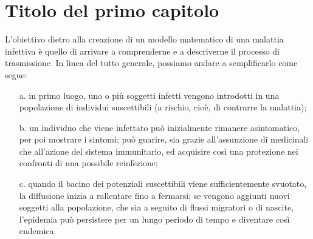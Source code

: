 \chapter{Titolo del primo capitolo}
\label{chap:cap1}
L'obiettivo dietro alla creazione di un modello matematico di una malattia infettiva è quello di arrivare a comprenderne e a descriverne il processo di trasmissione. In linea del tutto generale, possiamo andare a semplificarlo come segue:

\begin{enumerate}
\item[a.] in primo luogo, uno o più soggetti infetti vengono introdotti in una popolazione di individui suscettibili (a rischio, cioè, di contrarre la malattia);
\item[b.] un individuo che viene infettato può inizialmente rimanere asintomatico, per poi mostrare i sintomi; può guarire, sia grazie all'assunzione di medicinali che all'azione del sistema immunitario, ed acquisire così una protezione nei confronti di una possibile reinfezione;
\item[c.] quando il bacino dei potenziali suscettibili viene sufficientemente svuotato, la diffusione inizia a rallentare fino a fermarsi; se vengono aggiunti nuovi soggetti alla popolazione, che sia a seguito di flussi migratori o di nascite, l'epidemia può persistere per un lungo periodo di tempo e diventare così endemica. \\
\end{enumerate}

